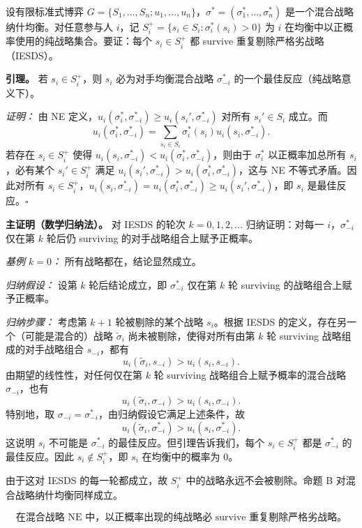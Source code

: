 \sol
设有限标准式博弈 $G=\{S_1,\dots,S_n;u_1,\dots,u_n\}$，$\sigma^*=(\sigma_1^*,\dots,\sigma_n^*)$ 是一个混合战略纳什均衡。对任意参与人 $i$，记 $S_i^+=\{s_i\in S_i:\sigma_i^*(s_i)>0\}$ 为 $i$ 在均衡中以正概率使用的纯战略集合。要证：每个 $s_i\in S_i^+$ 都 survive 重复剔除严格劣战略（IESDS）。

\textbf{引理。} 若 $s_i\in S_i^+$，则 $s_i$ 必为对手均衡混合战略 $\sigma_{-i}^*$ 的一个最佳反应（纯战略意义下）。

\textit{证明：} 由 NE 定义，$u_i(\sigma_i^*,\sigma_{-i}^*)\ge u_i(s_i',\sigma_{-i}^*)$ 对所有 $s_i'\in S_i$ 成立。而
\[
  u_i(\sigma_i^*,\sigma_{-i}^*)=\sum_{s_i\in S_i}\sigma_i^*(s_i)u_i(s_i,\sigma_{-i}^*).
\]\indent
若存在 $s_i\in S_i^+$ 使得 $u_i(s_i,\sigma_{-i}^*)<u_i(\sigma_i^*,\sigma_{-i}^*)$，则由于 $\sigma_i^*$ 以正概率加总所有 $s_i$，必有某个 $s_i'\in S_i^+$ 满足 $u_i(s_i',\sigma_{-i}^*)>u_i(\sigma_i^*,\sigma_{-i}^*)$，这与 NE 不等式矛盾。因此对所有 $s_i\in S_i^+$，$u_i(s_i,\sigma_{-i}^*)=u_i(\sigma_i^*,\sigma_{-i}^*)\ge u_i(s_i',\sigma_{-i}^*)$，即 $s_i$ 是最佳反应。$\square$

\textbf{主证明（数学归纳法）。} 对 IESDS 的轮次 $k=0,1,2,\dots$ 归纳证明：对每一 $i$，$\sigma_{-i}^*$ 仅在第 $k$ 轮后仍 surviving 的对手战略组合上赋予正概率。

\textit{基例 $k=0$：} 所有战略都在，结论显然成立。

\textit{归纳假设：} 设第 $k$ 轮后结论成立，即 $\sigma_{-i}^*$ 仅在第 $k$ 轮 surviving 的战略组合上赋予正概率。

\textit{归纳步骤：} 考虑第 $k+1$ 轮被剔除的某个战略 $s_i$。根据 IESDS 的定义，存在另一个（可能是混合的）战略 $\tilde\sigma_i$ 尚未被剔除，使得对所有由第 $k$ 轮 surviving 战略组成的对手战略组合 $s_{-i}$，都有
\[
  u_i(\tilde\sigma_i,s_{-i})>u_i(s_i,s_{-i}).
\]\indent
由期望的线性性，对任何仅在第 $k$ 轮 surviving 战略组合上赋予概率的混合战略 $\sigma_{-i}$，也有
\[
  u_i(\tilde\sigma_i,\sigma_{-i})>u_i(s_i,\sigma_{-i}).
\]\indent
特别地，取 $\sigma_{-i}=\sigma_{-i}^*$，由归纳假设它满足上述条件，故
\[
  u_i(\tilde\sigma_i,\sigma_{-i}^*)>u_i(s_i,\sigma_{-i}^*).
\]\indent
这说明 $s_i$ 不可能是 $\sigma_{-i}^*$ 的最佳反应。但引理告诉我们，每个 $s_i\in S_i^+$ 都是 $\sigma_{-i}^*$ 的最佳反应。因此 $s_i\notin S_i^+$，即 $s_i$ 在均衡中的概率为 0。

由于这对 IESDS 的每一轮都成立，故 $S_i^+$ 中的战略永远不会被剔除。命题 B 对混合战略纳什均衡同样成立。

\[
  \boxed{\text{在混合战略 NE 中，以正概率出现的纯战略必 survive 重复剔除严格劣战略。}}
\]\indent

